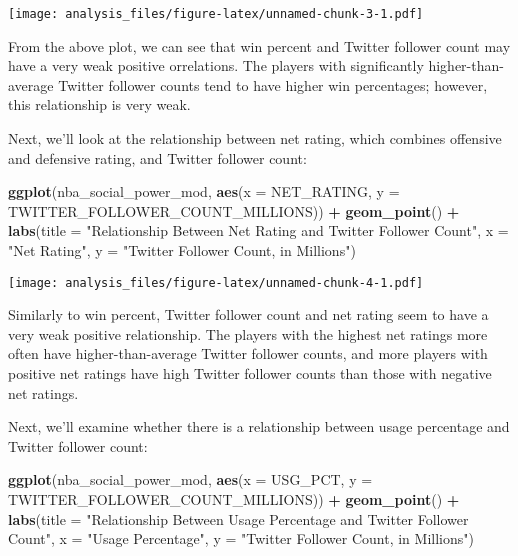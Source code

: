 \documentclass[]{article}
\newenvironment{Shaded}{\begin{snugshade}}{\end{snugshade}}
\newcommand{\DataTypeTok}[1]{\textcolor[rgb]{0.13,0.29,0.53}{#1}}
\newcommand{\KeywordTok}[1]{\textcolor[rgb]{0.13,0.29,0.53}{\textbf{#1}}}
\newcommand{\NormalTok}[1]{#1}
\newcommand{\OperatorTok}[1]{\textcolor[rgb]{0.81,0.36,0.00}{\textbf{#1}}}
\newcommand{\StringTok}[1]{\textcolor[rgb]{0.31,0.60,0.02}{#1}}
\begin{document}
\texttt{[image: analysis\_files/figure-latex/unnamed-chunk-3-1.pdf]}

From the above plot, we can see that win percent and Twitter follower
count may have a very weak positive orrelations. The players with
significantly higher-than-average Twitter follower counts tend to have
higher win percentages; however, this relationship is very weak.

Next, we'll look at the relationship between net rating, which combines
offensive and defensive rating, and Twitter follower count:

\begin{Shaded}
\begin{Highlighting}[]
\KeywordTok{ggplot}\NormalTok{(nba_social_power_mod, }\KeywordTok{aes}\NormalTok{(}\DataTypeTok{x =}\NormalTok{ NET_RATING, }\DataTypeTok{y =}\NormalTok{ TWITTER_FOLLOWER_COUNT_MILLIONS)) }\OperatorTok{+}\StringTok{ }
\StringTok{  }\KeywordTok{geom_point}\NormalTok{() }\OperatorTok{+}\StringTok{ }
\StringTok{  }\KeywordTok{labs}\NormalTok{(}\DataTypeTok{title =} \StringTok{"Relationship Between Net Rating and Twitter Follower Count"}\NormalTok{,}
       \DataTypeTok{x =} \StringTok{"Net Rating"}\NormalTok{, }\DataTypeTok{y =} \StringTok{"Twitter Follower Count, in Millions"}\NormalTok{)}
\end{Highlighting}
\end{Shaded}

\texttt{[image: analysis\_files/figure-latex/unnamed-chunk-4-1.pdf]}

Similarly to win percent, Twitter follower count and net rating seem to
have a very weak positive relationship. The players with the highest net
ratings more often have higher-than-average Twitter follower counts, and
more players with positive net ratings have high Twitter follower counts
than those with negative net ratings.

Next, we'll examine whether there is a relationship between usage
percentage and Twitter follower count:

\begin{Shaded}
\begin{Highlighting}[]
\KeywordTok{ggplot}\NormalTok{(nba_social_power_mod,}
       \KeywordTok{aes}\NormalTok{(}\DataTypeTok{x =}\NormalTok{ USG_PCT,}
           \DataTypeTok{y =}\NormalTok{ TWITTER_FOLLOWER_COUNT_MILLIONS)) }\OperatorTok{+}\StringTok{ }
\StringTok{  }\KeywordTok{geom_point}\NormalTok{() }\OperatorTok{+}\StringTok{ }
\StringTok{  }\KeywordTok{labs}\NormalTok{(}\DataTypeTok{title =} \StringTok{"Relationship Between Usage Percentage and Twitter Follower Count"}\NormalTok{,}
       \DataTypeTok{x =} \StringTok{"Usage Percentage"}\NormalTok{,}
       \DataTypeTok{y =} \StringTok{"Twitter Follower Count, in Millions"}\NormalTok{)}
\end{Highlighting}
\end{Shaded}
\end{document}

